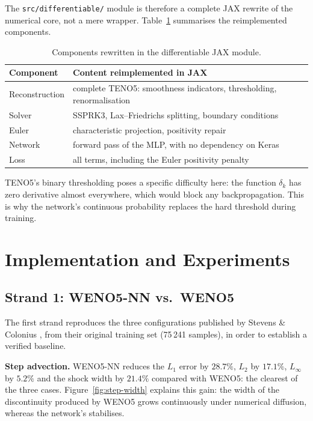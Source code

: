 \documentclass[12pt,a4paper,oneside]{report}
\begin{document}
The \texttt{src/differentiable/} module is therefore a complete JAX rewrite of
the numerical core, not a mere wrapper. Table~\ref{tab:jax} summarises the
reimplemented components.

\begin{table}[H]
\centering
\begin{tabularx}{\textwidth}{@{}lX@{}}
\toprule
\textbf{Component} & \textbf{Content reimplemented in JAX} \\
\midrule
Reconstruction & complete TENO5: smoothness indicators, thresholding, renormalisation \\
\rowrule
Solver & SSPRK3, Lax--Friedrichs splitting, boundary conditions \\
\rowrule
Euler & characteristic projection, positivity repair \\
\rowrule
Network & forward pass of the MLP, with no dependency on Keras \\
\rowrule
Loss & all terms, including the Euler positivity penalty \\
\bottomrule
\end{tabularx}
\caption{Components rewritten in the differentiable JAX module.}
\label{tab:jax}
\end{table}

TENO5's binary thresholding poses a specific difficulty here: the function
$\delta_k$ has zero derivative almost everywhere, which would block any
backpropagation. This is why the network's continuous probability replaces the
hard threshold during training.

\chapter{Implementation and Experiments}
\label{chap:work}

\section{Strand 1: WENO5-NN vs.\ WENO5}
\label{sec:strand1}

The first strand reproduces the three configurations published by Stevens \&
Colonius \cite{stevens2020}, from their original training set (75\,241
samples), in order to establish a verified baseline.

\textbf{Step advection.} WENO5-NN reduces the $L_1$ error by $28.7\%$, $L_2$ by
$17.1\%$, $L_\infty$ by $5.2\%$ and the shock width by $21.4\%$ compared with
WENO5: the clearest of the three cases. Figure~\ref{fig:step-width} explains
this gain: the width of the discontinuity produced by WENO5 grows continuously
under numerical diffusion, whereas the network's stabilises.
\end{document}
